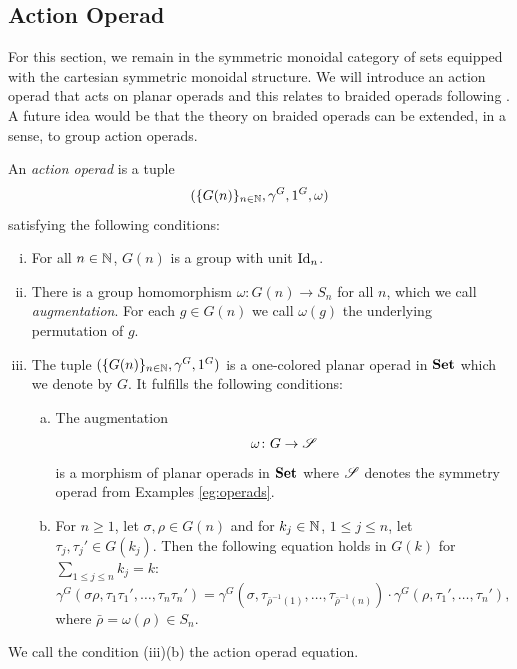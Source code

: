\subsection{Action Operad}
For this section, we remain in the symmetric monoidal category of sets equipped
with the cartesian symmetric monoidal structure. We will introduce an action
operad that acts on planar operads and this relates to braided operads following
\cite{yau}. A future idea would be that the theory on braided operads can be extended,
in a sense, to group action operads.

\begin{defin}
    An {\em action operad} is a tuple
    \[
        (\{G(n)\}_{n \in \N}, \gamma^G, 1^G, \omega)
    \]
    satisfying the following conditions:
    \begin{enumerate}[(i)]
        \item For all $n \in \N$, $G(n)$ is a group with unit $\id_n$.
        \item There is a group homomorphism $\omega \colon G(n) \to S_n$ for all
        $n$, which we call \emph{augmentation}. For each $g \in G(n)$ we call
        $\omega(g)$ the underlying permutation of $g$.
        \item The tuple $(\{G(n)\}_{n \in \N}, \gamma^G, 1^G)$ is a one-colored
        planar operad in $\Set$ which we denote by $G$. It fulfills the
        following conditions:
        \begin{enumerate}[(a)]
            \item The augmentation
            \[
            \omega \colon G \to \S
            \]
            is a morphism of planar operads in $\Set$ where $\S$ denotes the
            symmetry operad from Examples \ref{eg:operads}.
            \item For $n \geq 1$, let $\sigma, \rho \in G(n)$ and for $k_j \in
            \N$, $1 \leq j \leq n$, let $\tau_j, \tau_j' \in G(k_j)$. Then the
            following equation holds in $G(k)$ for $ \sum_{1 \leq j \leq n} k_j
            = k$:
            \[
                \gamma^G(\sigma \rho, \tau_1 \tau_1', \dots, \tau_n \tau_n') = \gamma^G(\sigma, \tau_{\bar{\rho}^{-1}(1)}, \dots, \tau_{\bar{\rho}^{-1}(n)}) \cdot \gamma^G(\rho, \tau_1', \dots, \tau_n'),
            \]
            where $\bar{\rho} = \omega(\rho) \in S_n$.
        \end{enumerate}
    \end{enumerate}
\end{defin}
We call the condition (iii)(b) the action operad equation.

